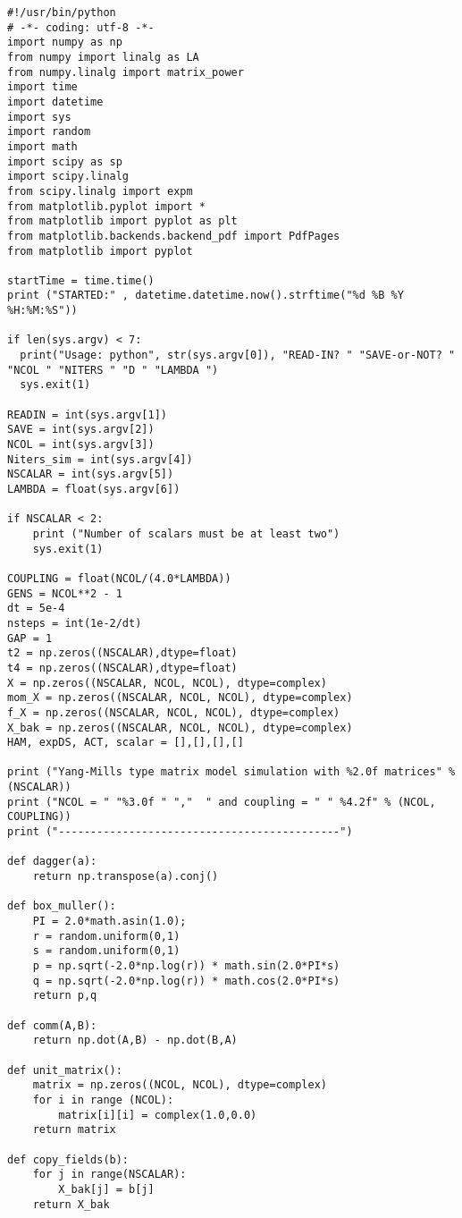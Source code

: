 \begin{lstlisting}
#!/usr/bin/python
# -*- coding: utf-8 -*-
import numpy as np
from numpy import linalg as LA
from numpy.linalg import matrix_power
import time 
import datetime 
import sys
import random
import math
import scipy as sp
import scipy.linalg
from scipy.linalg import expm
from matplotlib.pyplot import *
from matplotlib import pyplot as plt
from matplotlib.backends.backend_pdf import PdfPages
from matplotlib import pyplot

startTime = time.time()
print ("STARTED:" , datetime.datetime.now().strftime("%d %B %Y %H:%M:%S"))

if len(sys.argv) < 7:
  print("Usage: python", str(sys.argv[0]), "READ-IN? " "SAVE-or-NOT? " "NCOL " "NITERS " "D " "LAMBDA ")
  sys.exit(1)

READIN = int(sys.argv[1])
SAVE = int(sys.argv[2])
NCOL = int(sys.argv[3]) 
Niters_sim = int(sys.argv[4]) 
NSCALAR = int(sys.argv[5])
LAMBDA = float(sys.argv[6])

if NSCALAR < 2:
    print ("Number of scalars must be at least two")
    sys.exit(1) 

COUPLING = float(NCOL/(4.0*LAMBDA))
GENS = NCOL**2 - 1
dt = 5e-4
nsteps = int(1e-2/dt)
GAP = 1
t2 = np.zeros((NSCALAR),dtype=float)
t4 = np.zeros((NSCALAR),dtype=float)
X = np.zeros((NSCALAR, NCOL, NCOL), dtype=complex)
mom_X = np.zeros((NSCALAR, NCOL, NCOL), dtype=complex)
f_X = np.zeros((NSCALAR, NCOL, NCOL), dtype=complex)
X_bak = np.zeros((NSCALAR, NCOL, NCOL), dtype=complex)
HAM, expDS, ACT, scalar = [],[],[],[]

print ("Yang-Mills type matrix model simulation with %2.0f matrices" % (NSCALAR)) 
print ("NCOL = " "%3.0f " ","  " and coupling = " " %4.2f" % (NCOL, COUPLING)) 
print ("--------------------------------------------")

def dagger(a):
    return np.transpose(a).conj()

def box_muller():
    PI = 2.0*math.asin(1.0);    
    r = random.uniform(0,1)
    s = random.uniform(0,1)
    p = np.sqrt(-2.0*np.log(r)) * math.sin(2.0*PI*s)
    q = np.sqrt(-2.0*np.log(r)) * math.cos(2.0*PI*s)
    return p,q

def comm(A,B):
    return np.dot(A,B) - np.dot(B,A)

def unit_matrix():
    matrix = np.zeros((NCOL, NCOL), dtype=complex)
    for i in range (NCOL):
        matrix[i][i] = complex(1.0,0.0)
    return matrix

def copy_fields(b):
    for j in range(NSCALAR):
        X_bak[j] = b[j]
    return X_bak


\end{lstlisting}
